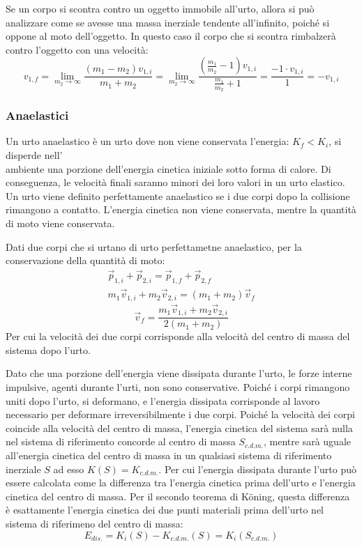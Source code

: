 \documentclass{article}
\numberwithin{equation}{subsection}
\begin{document}
Se un corpo si scontra contro un oggetto immobile all'urto, 
allora si può analizzare come se avesse una massa inerziale 
tendente all'infinito, poiché si oppone al moto dell'oggetto. 
In questo caso il corpo che si scontra rimbalzerà contro l'oggetto 
con una velocità:
\begin{equation}
    v_{1,f}=\displaystyle\lim_{m_2\to\infty}\frac{(m_1-m_2)v_{1,i}}{m_1+m_2}=\lim_{m_2\to\infty}\frac{\left(\frac{m_1}{m_2}-1\right)v_{1,i}}{\frac{m_1}{m_2}+1}=\frac{-1\cdot v_{1,i}}{1}=-v_{1,i}
\end{equation}

\subsubsection{Anaelastici}


Un urto anaelastico è un urto dove non viene conservata 
l'energia: $K_f<K_i$, si disperde nell'\\ambiente una porzione 
dell'energia cinetica iniziale sotto forma di calore. Di conseguenza, le velocità 
finali saranno minori dei loro valori in un urto elastico. 
\\
Un urto viene definito perfettamente anaelastico se i due corpi dopo la collisione rimangono a contatto. L'energia cinetica non viene conservata, 
mentre la quantità di moto viene conservata. 


Dati due corpi che si urtano di urto perfettametne anaelastico, per la conservazione della quantità di moto:
\begin{gather*}
    \vec{p}_{1,i}+\vec{p}_{2,i}=\vec{p}_{1,f}+\vec{p}_{2,f}\\
    m_1\vec{v}_{1,i}+m_2\vec{v}_{2,i}=(m_1+m_2)\vec{v}_f
\end{gather*}
\begin{equation}
    \vec{v}_f=\displaystyle\frac{m_1\vec{v}_{1,i}+m_2\vec{v}_{2,i}}{2(m_1+m_2)}
\end{equation}
Per cui la velocità dei due corpi corrisponde 
alla velocità del centro di massa del sistema dopo l'urto. 



Dato che una porzione dell'energia viene dissipata durante l'urto, le forze interne impulsive, agenti durante l'urti, non sono conservative. Poiché i corpi rimangono 
uniti dopo l'urto, si deformano, e l'energia dissipata corrisponde al lavoro necessario per deformare irreversibilmente i due corpi. 
Poiché la velocità dei corpi coincide alla velocità del centro di massa, 
l'energia cinetica del sistema sarà nulla nel sistema di 
riferimento concorde al centro di massa $S_{c.d.m.}$, mentre sarà uguale all'energia 
cinetica del centro di massa in un qualsiasi sistema di riferimento inerziale $S$ 
ad esso $K(S)=K_{c.d.m.}$. Per cui l'energia dissipata durante l'urto può essere calcolata come la differenza tra l'energia cinetica prima dell'urto e 
l'energia cinetica del centro di massa. Per il secondo teorema di K\"oning, questa differenza è esattamente l'energia cinetica dei due punti materiali prima dell'urto 
nel sistema di riferimeno del centro di massa: 
\begin{equation}
    E_{dis.}=K_i(S)-K_{c.d.m.}(S)=K_i(S_{c.d.m.})
\end{equation}
\end{document}
